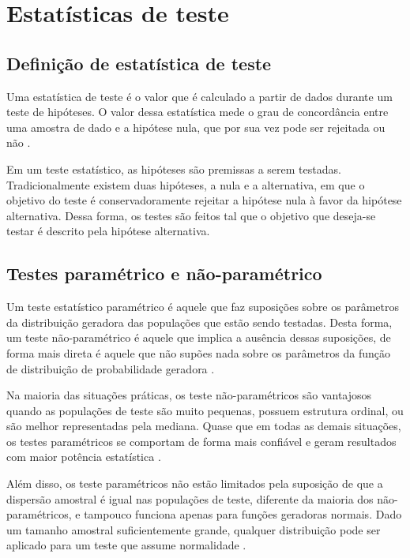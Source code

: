 


\chapter{Estatísticas de teste}
\label{chap:testStatistics}

\section{Definição de estatística de teste}
Uma estatística de teste é o valor que é calculado a partir de dados durante um teste de hipóteses. O valor dessa estatística mede o grau de concordância entre uma amostra de dado e a hipótese nula, que por sua vez pode ser rejeitada ou não \cite{Casella2002}. 

Em um teste estatístico, as hipóteses são premissas a serem testadas. Tradicionalmente existem duas hipóteses, a nula e a alternativa, em que o objetivo do teste é conservadoramente rejeitar a hipótese nula à favor da hipótese alternativa. Dessa forma, os testes são feitos tal que o objetivo que deseja-se testar é descrito pela hipótese alternativa.

\section{Testes paramétrico e não-paramétrico}
Um teste estatístico paramétrico é aquele que faz suposições sobre os parâmetros da distribuição geradora das populações que estão sendo testadas. Desta forma, um teste não-paramétrico é aquele que implica a ausência dessas suposições, de forma mais direta é aquele que não supões nada sobre os parâmetros da função de distribuição de probabilidade geradora \cite{LowryTrem}.

Na maioria das situações práticas, os teste não-paramétricos são vantajosos quando as populações de teste são muito pequenas, possuem estrutura ordinal, ou são melhor representadas pela mediana. Quase que em todas as demais situações, os testes paramétricos se comportam de forma mais confiável e geram resultados com maior potência estatística \cite{Casella2002}.

Além disso, os teste paramétricos não estão limitados pela suposição de que a dispersão amostral é igual nas populações de teste, diferente da maioria dos não-paramétricos, e tampouco funciona apenas para funções geradoras normais. Dado um tamanho amostral suficientemente grande, qualquer distribuição pode ser aplicado para um teste que assume
normalidade \cite{KernsFerro}.

